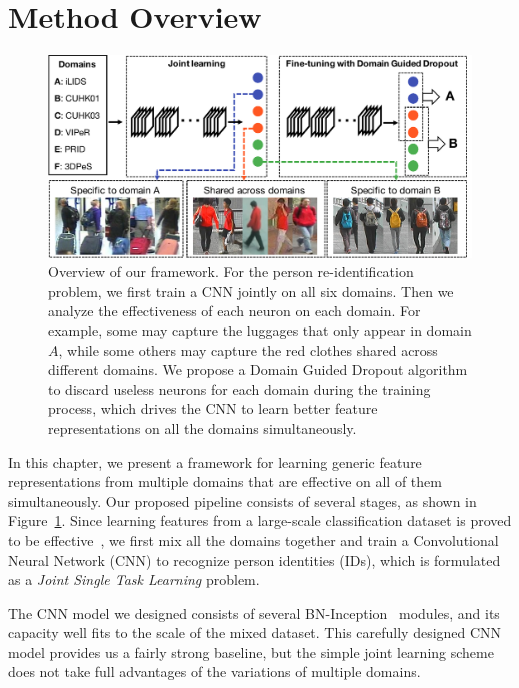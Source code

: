 \section{Method Overview} %
\label{sec:md-overview}
\begin{figure}[t]
\begin{center}
\includegraphics[width=1.0\linewidth]{figures/multi_domain/overview.pdf}
\end{center}
\caption{Overview of our framework. For the person re-identification problem, we first train a CNN jointly on all six domains. Then we analyze the effectiveness of each neuron on each domain. For example, some may capture the luggages that only appear in domain $A$, while some others may capture the red clothes shared across different domains. We propose a Domain Guided Dropout algorithm to discard useless neurons for each domain during the training process, which drives the CNN to learn better feature representations on all the domains simultaneously.}
\label{fig:md-overview}
\end{figure}

In this chapter, we present a framework for learning generic feature representations from multiple domains that are effective on all of them simultaneously. Our proposed pipeline consists of several stages, as shown in Figure~\ref{fig:md-overview}. Since learning features from a large-scale classification dataset is proved to be effective~\cite{sun2014deep1}, we first mix all the domains together and train a Convolutional Neural Network (CNN) to recognize person identities (IDs), which is formulated as a \emph{Joint Single Task Learning} problem.

The CNN model we designed consists of several BN-Inception~\cite{szegedy2014going,ioffe2015batch} modules, and its capacity well fits to the scale of the mixed dataset. This carefully designed CNN model provides us a fairly strong baseline, but the simple joint learning scheme does not take full advantages of the variations of multiple domains.

